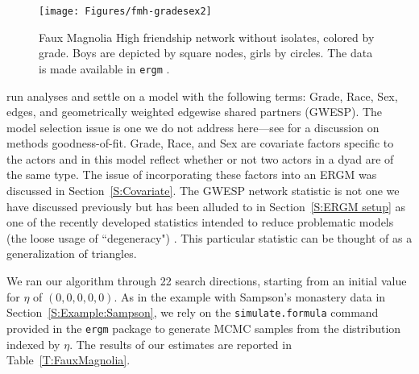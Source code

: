\begin{figure}[!h]
\centering
\texttt{[image: Figures/fmh-gradesex2]}
\caption[Faux Magnolia High friendship network]
{Faux Magnolia High friendship network without isolates, colored by grade.  Boys
are depicted by square nodes, girls by circles.  The data is made available in \texttt{ergm} \citep{ergm:R}.}
\label{F:fmh}
\end{figure}

\citet{statnet-tutorial} run analyses and settle on a model with the following terms: 
Grade, Race, Sex, edges, and geometrically weighted edgewise shared partners (GWESP). The model selection issue is one we do not address here---see \citet{GOF}
 for a discussion on methods goodness-of-fit.  
Grade, Race, and Sex are covariate factors specific to the 
actors and in this model reflect whether or not two actors in a dyad are of the same type.  
The issue of incorporating these factors into an ERGM was 
discussed in Section~\ref{S:Covariate}.  The GWESP network statistic is not one we
have discussed previously but has been alluded to in Section~\ref{S:ERGM setup} as
one of the recently developed statistics intended to reduce problematic models
(the loose usage of ``degeneracy") 
\citep{Handcock:2006, Hunter:2006, recentp*}.  This particular statistic can be 
thought of as a generalization of triangles.

We ran our algorithm through 22 search directions, starting from an initial value for 
$\eta$ of $(0, 0, 0, 0, 0)$.  As in the example with Sampson's monastery data
in Section~\ref{S:Example:Sampson}, we rely
on the \texttt{simulate.formula} command provided in the \texttt{ergm} package to
generate MCMC samples from the distribution indexed by $\eta$.  The results of our 
estimates are reported in Table~\ref{T:FauxMagnolia}.
%
%
%


